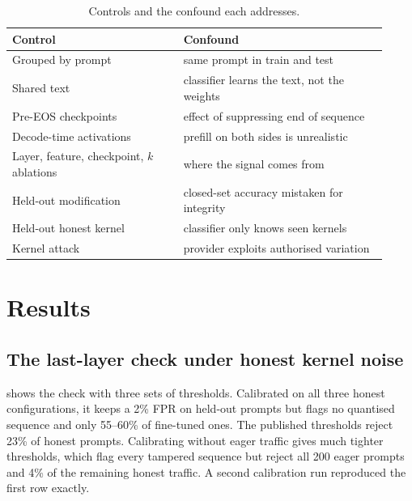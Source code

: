 \documentclass[11pt]{article}
\begin{document}
\begin{table}[!htb]
\centering
\small
\caption{Controls and the confound each addresses.}
\label{tab:controls}
\begin{tabular}{@{}>{\raggedright\arraybackslash}p{0.42\linewidth}>{\raggedright\arraybackslash}p{0.5\linewidth}@{}}
\toprule
Control & Confound \\
\midrule
Grouped by prompt & same prompt in train and test \\
Shared text & classifier learns the text, not the weights \\
Pre-EOS checkpoints & effect of suppressing end of sequence \\
Decode-time activations & prefill on both sides is unrealistic \\
Layer, feature, checkpoint, $k$ ablations & where the signal comes from \\
Held-out modification & closed-set accuracy mistaken for integrity \\
Held-out honest kernel & classifier only knows seen kernels \\
Kernel attack & provider exploits authorised variation \\
\bottomrule
\end{tabular}
\end{table}

\section{Results}
\label{sec:results}

\subsection{The last-layer check under honest kernel noise}
\label{sec:res-baseline}

 shows the check with three sets of thresholds.
Calibrated on all three honest configurations, it keeps a 2\% FPR on held-out prompts but flags no quantised sequence and only 55--60\% of fine-tuned ones.
The published thresholds reject 23\% of honest prompts.
Calibrating without eager traffic gives much tighter thresholds, which flag every tampered sequence but reject all 200 eager prompts and 4\% of the remaining honest traffic.
A second calibration run reproduced the first row exactly.
\end{document}
